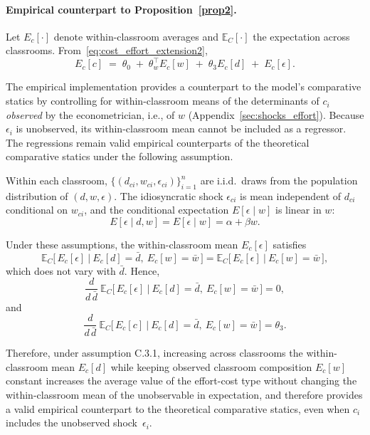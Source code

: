 \paragraph{Empirical counterpart to Proposition~\ref{prop2}.} Let $E_c[\cdot]$ denote within-classroom averages and $\mathbb E_C[\cdot]$ the expectation across classrooms. From~\eqref{eq:cost_effort_extension2},
\begin{equation}\label{eq:avg_cost_effort_extension}
E_c[c] \;=\; \theta_0 \;+\; \theta_w^\top E_c[w] \;+\; \theta_3 E_c[d] \;+\; E_c[\epsilon].
\end{equation}

The empirical implementation provides a counterpart to the model’s comparative statics by controlling for within-classroom means of the determinants of $c_i$ \emph{observed} by the econometrician, i.e., of $w$ (Appendix~\ref{sec:shocks_effort}). Because $\epsilon_i$ is unobserved, its within-classroom mean cannot be included as a regressor. The regressions remain valid empirical counterparts of the theoretical comparative statics under the following assumption.

Within each classroom, $\{(d_{ci},w_{ci},\epsilon_{ci})\}_{i=1}^n$ are i.i.d.\ draws from the population distribution of $(d,w,\epsilon)$. The idiosyncratic shock $\epsilon_{ci}$ is mean independent of $d_{ci}$ conditional on $w_{ci}$, and the conditional expectation $E[\epsilon \mid w]$ is linear in $w$:
\[
E[\epsilon \mid d,w] = E[\epsilon \mid w]=\alpha + \beta w.
\]
\label{ass:epsilon_indep}

\vspace{-20pt}
\noindent Under these assumptions, the within-classroom mean $E_c[\epsilon]$ satisfies 
\[
\mathbb{E}_C\!\big[\,E_c[\epsilon]\ \big|\ E_c[d]=\bar d,\ E_c[w]=\bar w\,\big]
=  \mathbb{E}_C\!\big[\,E_c[\epsilon]\ \big|\ E_c[w]=\bar w\,\big],
\]
which does not vary with $\bar d$. Hence,
\[
\frac{d}{d\,\bar d}\ 
\mathbb{E}_C\!\big[\,E_c[\epsilon]\ \big|\ E_c[d]=\bar d,\ E_c[w]=\bar w\,\big]
= 0,
\]
and
\[
\frac{d}{d\,\bar d}\ 
\mathbb{E}_C\!\big[\,E_c[c]\ \big|\ E_c[d]=\bar d,\ E_c[w]=\bar w\,\big]
= \theta_3.
\]

Therefore, under assumption C.3.1, increasing across classrooms the within-classroom mean $E_c[d]$ while keeping observed classroom composition $E_c[w]$ constant increases the average value of the effort-cost type without changing the within-classroom mean of the unobservable in expectation, and therefore provides a valid empirical counterpart to the theoretical comparative statics, even when $c_i$ includes the unobserved shock~$\epsilon_i$. \par 


